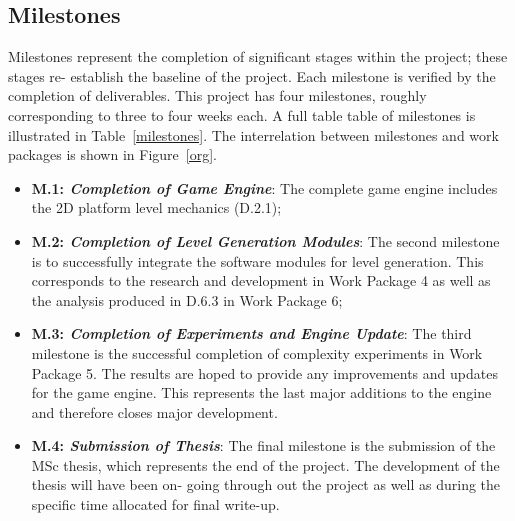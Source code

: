 \documentclass[a4paper]{article}
\begin{document}
\subsection{Milestones}

Milestones represent the completion of significant stages within the project; these stages re-
establish the baseline of the project. Each milestone is verified by the completion of deliverables.
This project has four milestones, roughly corresponding to three to four weeks each. A full table
table of milestones is illustrated in Table~\ref{milestones}. The interrelation between milestones and work packages is shown in Figure~\ref{org}.

\begin{itemize}

  \item \textbf{M.1: \textit{Completion of Game Engine}}: The complete game engine includes the 2D platform level mechanics (D.2.1);
\vspace{-3mm}
  \item \textbf{M.2: \textit{Completion of Level Generation Modules}}: The second milestone is to successfully
  integrate the software modules for level generation. This corresponds to the research and
  development in Work Package 4 as well as the analysis produced in D.6.3 in Work Package 6;
\vspace{-3mm}
  \item \textbf{M.3: \textit{Completion of Experiments and Engine Update}}: The third milestone is
the successful completion of complexity experiments in Work Package 5. The results are hoped to
provide any improvements and updates for the game engine. This represents the last major additions
to the engine and therefore closes major development.
\vspace{-3mm}
\item \textbf{M.4: \textit{Submission of Thesis}}: The final milestone is the submission of the MSc
thesis, which represents the end of the project. The development of the thesis will have been on-
going through out the project as well as during the specific time allocated for final write-up.
\vspace{-3mm}

\end{itemize}
\end{document}
